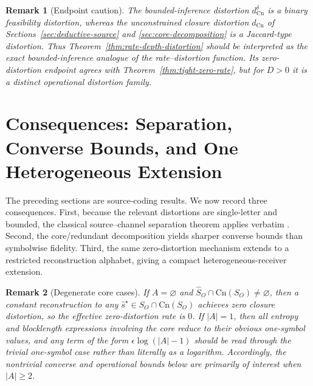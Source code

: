 \documentclass[journal,onecolumn]{IEEEtran}
\newcommand{\Cn}{\text{Cn}}
\newtheorem{remark}{Remark}[section]
\numberwithin{equation}{section}
\begin{document}
\begin{remark}[Endpoint caution]
\label{rem:depth-endpoint-caution}
The bounded-inference distortion \(d_{\Cn}^{\delta}\) is a
binary feasibility distortion, whereas the unconstrained closure
distortion \(d_{\Cn}\) of Sections~\ref{sec:deductive-source} and
\ref{sec:core-decomposition} is a Jaccard-type distortion.
Thus Theorem~\ref{thm:rate-depth-distortion} should be interpreted
as the exact bounded-inference analogue of the
rate--distortion function.
Its zero-distortion endpoint agrees with
Theorem~\ref{thm:tight-zero-rate}, but for \(D>0\) it is a distinct
operational distortion family.
\end{remark}

\section{Consequences: Separation, Converse Bounds, and One Heterogeneous Extension}
\label{sec:consequences}

The preceding sections are source-coding results.
We now record three consequences.
First, because the relevant distortions are single-letter and
bounded, the classical source--channel separation theorem applies
verbatim
\cite{shannon1959coding,cover2006elements,csiszar2011information}.
Second, the core/redundant decomposition yields sharper converse
bounds than symbolwise fidelity.
Third, the same zero-distortion mechanism extends to a restricted
reconstruction alphabet, giving a compact heterogeneous-receiver
extension.

\begin{remark}[Degenerate core cases]
\label{rem:degenerate-core-cases}
If \(A=\varnothing\) and
\(\hat S_O\cap\Cn(S_O)\neq\varnothing\), then a constant
reconstruction to any
\(\hat s^\star\in \hat S_O\cap\Cn(S_O)\) achieves zero closure
distortion, so the effective zero-distortion rate is \(0\).
If \(|A|=1\), then all entropy and blocklength expressions involving
the core reduce to their obvious one-symbol values, and any term of
the form \(\epsilon\log(|A|-1)\) should be read through the trivial
one-symbol case rather than literally as a logarithm.
Accordingly, the nontrivial converse and operational bounds below are
primarily of interest when \(|A|\ge 2\).
\end{remark}
\end{document}
